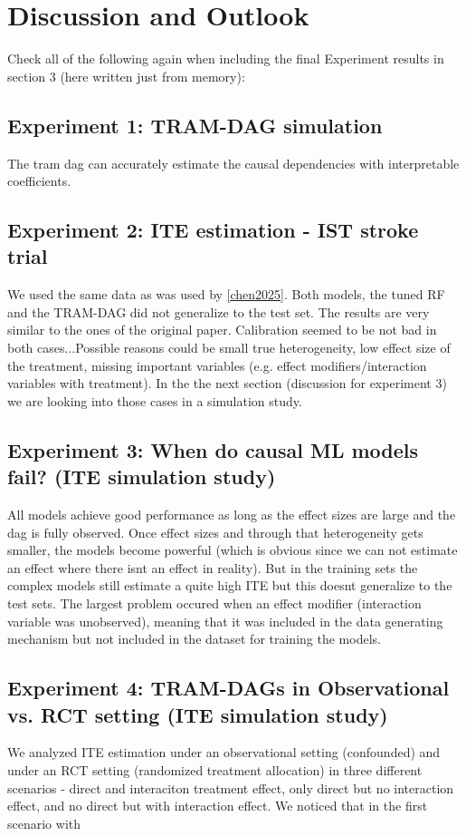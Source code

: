 

\chapter{Discussion and Outlook}


Check all of the following again when including the final Experiment results in section 3 (here written just from memory):


\section{Experiment 1: TRAM-DAG simulation}

The tram dag can accurately estimate the causal dependencies with interpretable coefficients.


\section{Experiment 2: ITE estimation - IST stroke trial}

We used the same data as was used by \ref{chen2025}. Both models, the tuned RF and the TRAM-DAG did not generalize to the test set. The results are very similar to the ones of the original paper. Calibration seemed to be not bad in both cases...Possible reasons could be small true heterogeneity, low effect size of the treatment, missing important variables (e.g. effect modifiers/interaction variables with treatment). In the the next section (discussion for experiment 3) we are looking into those cases in a simulation study.


\section{Experiment 3: When do causal ML models fail? (ITE simulation study)}

All models achieve good performance as long as the effect sizes are large and the dag is fully observed. Once effect sizes and through that heterogeneity gets smaller, the models become powerful (which is obvious since we can not estimate an effect where there isnt an effect in reality). But in the training sets the complex models still estimate a quite high ITE but this doesnt generalize to the test sets. The largest problem occured when an effect modifier (interaction variable was unobserved), meaning that it was included in the data generating mechanism but not included in the dataset for training the models. 



\section{Experiment 4: TRAM-DAGs in Observational vs. RCT setting  (ITE simulation study)}

We analyzed ITE estimation under an observational setting (confounded) and under an RCT setting (randomized treatment allocation) in three different scenarios - direct and interaciton treatment effect, only direct but no interaction effect, and no direct but with interaction effect. We noticed that in the first scenario with 
